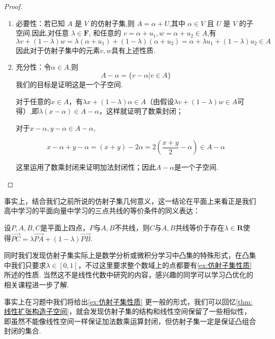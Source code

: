 \begin{proof}
    \begin{enumerate}
        \item 必要性：若已知 $A$ 是 $V$ 的仿射子集,则 $A=\alpha+U$,其中 $\alpha\in V$ 且 $U$ 是 $V$ 的子空间.因此,对任意 $\lambda \in \mathbf{F}$,
        和任意的 $v=\alpha+u_1,w=\alpha+u_2 \in A$,有
        \[
            \lambda v+(1-\lambda)w=\lambda(\alpha+u_1)+(1-\lambda)(\alpha+u_2)=\alpha+\lambda u_1+(1-\lambda)u_2 \in A
        \]
        因此对于仿射子集中的元素$v,w$具有上述性质.
        \item 充分性：令$\alpha \in A$,则
        \[
            A-\alpha=\{v-\alpha|v\in A\}
        \]
        我们的目标是证明这是一个子空间.

        对于任意的$x \in A$，有$\lambda x + (1 - \lambda) \alpha \in A$（由假设$\lambda v + (1 - \lambda) w \in A$可得）,即$\lambda (x-\alpha) \in A- \alpha $，这样就证明了数乘封闭；

        对于$x-\alpha,y-\alpha \in A-\alpha$,

        \[
           x-\alpha+y-\alpha=(x+y)-2\alpha=2\left(\dfrac{x+y}{2}-\alpha\right) \in A-\alpha
        \]

        这里运用了数乘封闭来证明加法封闭性；因此$A-\alpha$是一个子空间.
    \end{enumerate}
\end{proof}

事实上，结合我们之前所说的仿射子集几何意义，这一结论在平面上来看正是我们高中学习的平面向量中学习的三点共线的等价条件的同义表达：
\begin{theorem}{}{}
    设$P,A,B,C$是平面上四点，$P$与$A,B$不共线，则$C$与$A,B$共线等价于存在$\lambda\in\mathbf{R}$使得$\overrightarrow{PC}=\lambda\overrightarrow{PA}+(1-\lambda)\overrightarrow{PB}$.
\end{theorem}
同时我们发现仿射子集实际上是数学分析或微积分学习中凸集的特殊形式，在凸集中我们只要求$\lambda\in[0,1]$，不过这里要求整个数域上的点都要有\autoref{ex:仿射子集性质} 所述的性质. 当然这不是线性代数中研究的内容，感兴趣的同学可以学习凸优化的相关课程进一步了解.

事实上在习题中我们将给出\autoref{ex:仿射子集性质} 更一般的形式，我们可以回忆\autoref{thm:线性扩张构造子空间}，就会发现仿射子集的结构和线性空间保留了一些相似性，即虽然不能像线性空间一样保证加法数乘运算封闭，但仿射子集一定是保证凸组合封闭的集合.

